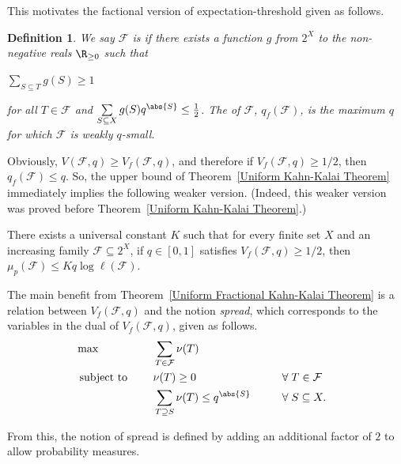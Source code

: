 \documentclass[12pt]{article}
\newtheorem*{definition*}{Definition}
\begin{document}
This motivates the factional version of expectation-threshold given as follows.
\begin{definition*}
We say $\mathcal{F}$ is  if there exists a function $g$ from $2^X$ to the non-negative reals $\R_{\geq 0}$ such that
\begin{center}
    $\displaystyle\sum\limits_{S\subseteq T} g(S)\geq 1$
\end{center}
for all $T\in\mathcal{F}$ and $\sum\limits_{S\subseteq X} g(S) q^{\abs{S}}\leq \frac{1}{2}$. The  of $\mathcal{F}$, $q_f(\mathcal{F})$, is the maximum $q$ for which $\mathcal{F}$ is weakly $q$-small.
\end{definition*}

Obviously, $V({\mathcal F},q)\ge V_f({\mathcal F},q)$, and therefore if $V_f(\mathcal{F},q)\geq 1/2$, then $q_f(\mathcal{F})\leq q$. So, the upper bound of Theorem~\ref{Uniform Kahn-Kalai Theorem} immediately implies the following weaker version. (Indeed, this weaker version was proved before Theorem~\ref{Uniform Kahn-Kalai Theorem}.)

\begin{theorem}
\label{Uniform Fractional Kahn-Kalai Theorem}
There exists a universal constant $K$ such that for every finite set $X$ and an increasing family $\mathcal{F}\subseteq 2^X$, if $q\in [0,1]$ satisfies $V_f(\mathcal{F},q)\geq 1/2$, then $\mu_p(\mathcal{F})\leq Kq\log\ell(\mathcal{F})$.
\end{theorem}

The main benefit from Theorem~\ref{Uniform Fractional Kahn-Kalai Theorem} is a relation between $V_f({\mathcal F},q)$ and the notion {\em spread}, which corresponds to the variables in the dual of $V_f({\mathcal F},q)$, given as follows.
\begin{alignat*}{7}
    &\max &&\displaystyle\sum\limits_{T\in\mathcal{F}} \nu(T)
    \\
    &\text{ subject to }\quad &&\nu(T)\geq 0 &&\hspace{3mm}&&\forall\hspace{1mm}  T\in\mathcal{F}
    \\ 
    & &&\sum\limits_{T\supseteq S} \nu(T)\leq q^{\abs{S}} &&\hspace{3mm}&&\forall\hspace{1mm} S\subseteq X.
\end{alignat*}

From this, the notion of spread is defined by adding an additional factor of $2$ to allow probability measures.
\end{document}
